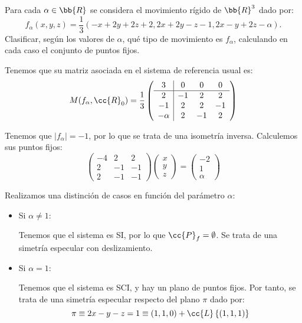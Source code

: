 \begin{ejercicio}
    Para cada $\alpha \in \bb{R}$ se considera el movimiento rígido de $\bb{R}^3$ dado por:
    \begin{equation*}
        f_\alpha(x,y,z)=\frac{1}{3}(-x + 2y + 2z + 2, 2x + 2y - z - 1, 2x - y + 2z - \alpha).
    \end{equation*}
    Clasificar, según los valores de $\alpha$, qué tipo de movimiento es $f_\alpha$, calculando en cada caso el conjunto de puntos fijos.

    Tenemos que su matriz asociada en el sistema de referencia usual es:
    \begin{equation*}
        M(f_\alpha, \cc{R}_0) = \frac{1}{3}\left(
        \begin{array}{c|ccc}
            3 & 0 & 0 & 0 \\ \hline
            2 & -1 & 2 & 2 \\
            -1 & 2 & 2 & -1 \\
            -\alpha & 2 & -1 & 2
        \end{array}
        \right)
    \end{equation*}

    Tenemos que $|f_\alpha| = -1$, por lo que se trata de una isometría inversa. Calculemos sus puntos fijos:
    \begin{equation*}
        \left(
        \begin{array}{ccc}
            -4 & 2 & 2 \\
            2 & -1 & -1 \\
            2 & -1 & -1
        \end{array}
        \right)
        \left(
        \begin{array}{c}
            x \\ y \\ z
        \end{array}
        \right)
        = \left(
        \begin{array}{c}
            -2 \\ 1 \\ \alpha
        \end{array}
        \right)
    \end{equation*}

    Realizamos una distinción de casos en función del parámetro $\alpha$:
    \begin{itemize}
        \item Si $\alpha \neq 1$:
        
        Tenemos que el sistema es SI, por lo que $\cc{P}_f=\emptyset$. Se trata de una simetría especular con deslizamiento.

        \item Si $\alpha = 1$:
        
        Tenemos que el sistema es SCI, y hay un plano de puntos fijos. Por tanto, se trata de una simetría especular respecto del plano $\pi$ dado por:
        \begin{equation*}
            \pi \equiv 2x-y-z=1 \equiv (1,1,0) + \cc{L}\left\{(1,1,1)\right\}
        \end{equation*}
    \end{itemize}
\end{ejercicio}

